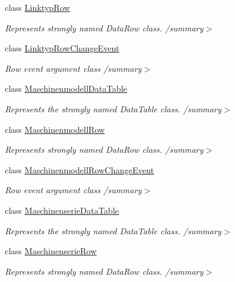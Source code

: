 \begin{DoxyCompactItemize}
class \hyperlink{class_products_1_1_data_1_1ds_sage_1_1_linktyp_row}{Linktyp\+Row}
\begin{DoxyCompactList}\small\item\em Represents strongly named Data\+Row class. /summary$>$ \end{DoxyCompactList}\item 
class \hyperlink{class_products_1_1_data_1_1ds_sage_1_1_linktyp_row_change_event}{Linktyp\+Row\+Change\+Event}
\begin{DoxyCompactList}\small\item\em Row event argument class /summary$>$ \end{DoxyCompactList}\item 
class \hyperlink{class_products_1_1_data_1_1ds_sage_1_1_maschinenmodell_data_table}{Maschinenmodell\+Data\+Table}
\begin{DoxyCompactList}\small\item\em Represents the strongly named Data\+Table class. /summary$>$ \end{DoxyCompactList}\item 
class \hyperlink{class_products_1_1_data_1_1ds_sage_1_1_maschinenmodell_row}{Maschinenmodell\+Row}
\begin{DoxyCompactList}\small\item\em Represents strongly named Data\+Row class. /summary$>$ \end{DoxyCompactList}\item 
class \hyperlink{class_products_1_1_data_1_1ds_sage_1_1_maschinenmodell_row_change_event}{Maschinenmodell\+Row\+Change\+Event}
\begin{DoxyCompactList}\small\item\em Row event argument class /summary$>$ \end{DoxyCompactList}\item 
class \hyperlink{class_products_1_1_data_1_1ds_sage_1_1_maschinenserie_data_table}{Maschinenserie\+Data\+Table}
\begin{DoxyCompactList}\small\item\em Represents the strongly named Data\+Table class. /summary$>$ \end{DoxyCompactList}\item 
class \hyperlink{class_products_1_1_data_1_1ds_sage_1_1_maschinenserie_row}{Maschinenserie\+Row}
\begin{DoxyCompactList}\small\item\em Represents strongly named Data\+Row class. /summary$>$ \end{DoxyCompactList}\item 

\end{DoxyCompactItemize}
